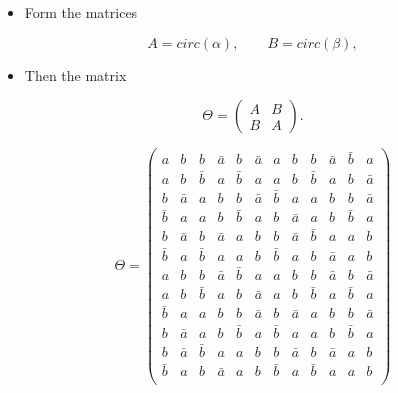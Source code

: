 \documentclass{beamer}
\begin{document}
\begin{frame}

  \begin{itemize}
  \item Form the matrices
  \end{itemize}

  $$
  A=circ(\alpha), \qquad B=circ(\beta),
  $$

  \begin{itemize}
    \item Then the matrix
  \end{itemize}

  $$
  \Theta = \begin{pmatrix}
                A & B \\ B & A
              \end{pmatrix}.
  $$

\end{frame}

\begin{frame}

  \[
    \Theta = 
    \left(
      \begin{array}{cccccc|cccccc}
        a&b&b&\bar{a}&b&\bar{a}&a&b&b&\bar{a}&\bar{b}&a\\
        a&b&\bar{b}&a&\bar{b}&a&a&b&\bar{b}&a&b&\bar{a}\\
        b&\bar{a}&a&b&b&\bar{a}&\bar{b}&a&a&b&b&\bar{a}\\
        \bar{b}&a&a&b&\bar{b}&a&b&\bar{a}&a&b&\bar{b}&a\\
        b&\bar{a}&b&\bar{a}&a&b&b&\bar{a}&\bar{b}&a&a&b\\
        \bar{b}&a&\bar{b}&a&a&b&\bar{b}&a&b&\bar{a}&a&b\\ \hline
        a&b&b&\bar{a}&\bar{b}&a&a&b&b&\bar{a}&b&\bar{a}\\
        a&b&\bar{b}&a&b&\bar{a}&a&b&\bar{b}&a&\bar{b}&a\\
        \bar{b}&a&a&b&b&\bar{a}&b&\bar{a}&a&b&b&\bar{a}\\
        b&\bar{a}&a&b&\bar{b}&a&\bar{b}&a&a&b&\bar{b}&a\\
        b&\bar{a}&\bar{b}&a&a&b&b&\bar{a}&b&\bar{a}&a&b\\
        \bar{b}&a&b&\bar{a}&a&b&\bar{b}&a&\bar{b}&a&a&b\\
      \end{array}
    \right)
  \]
  
\end{frame}
\end{document}
